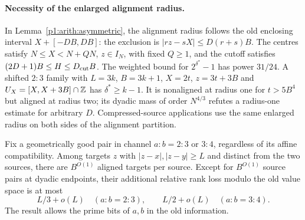\paragraph{Necessity of the enlarged alignment radius.}
In Lemma~\ref{p1:arith:asymmetric}, the alignment radius follows the
old enclosing interval $X+[-DB,DB]$: the exclusion is
$|rz-sX|\le D(r+s)B$. The centres satisfy
$N\le X<N+QN$, $z\in I_N$, with fixed $Q\ge1$, and the cutoff satisfies
$(2D+1)B\le H\le D_{\rm cut}B$. The weighted bound for $2^{\delta^*}-1$ has power $31/24$.
A shifted $2:3$ family with
$L=3k$, $B=3k+1$, $X=2t$, $z=3t+3B$ and
$U_X=[X,X+3B]\cap\mathbb Z$ has $\delta^*\ge k-1$. It is nonaligned at
radius one for $t>5B^4$ but aligned at radius two; its dyadic mass
of order $N^{4/3}$ refutes a radius-one estimate for arbitrary $D$.
Compressed-source applications use the same enlarged radius on both
sides of the alignment partition.

\begin{lemma}\label{p1:arith:palmrank}
Fix a geometrically good pair in channel $a:b=2:3$ or $3:4$, regardless
of its affine compatibility.  Among targets $z$ with
$|z-x|,|z-y|\geq L$ and distinct from the two sources, there are
$B^{O(1)}$ aligned targets per source.  Except for $B^{O(1)}$ source
pairs at dyadic endpoints, their additional relative rank loss modulo
the old value space is at most
\[
 L/3+o(L)\quad(a:b=2:3),\qquad
 L/2+o(L)\quad(a:b=3:4).
\]
The result allows the prime bits of $a,b$ in the old information.
\end{lemma}

